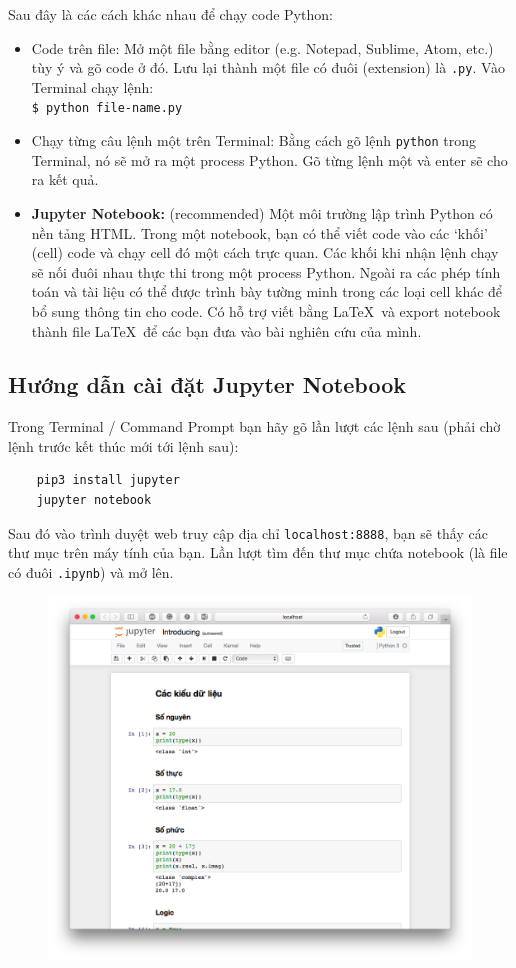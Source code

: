 \documentclass[12pt, a4paper, twoside]{article}
\begin{document}
Sau đây là các cách khác nhau để chạy code Python:
\begin{itemize}
    \item Code trên file: Mở một file bằng editor (e.g. Notepad, Sublime, Atom, etc.) tùy ý và gõ code ở đó. Lưu lại thành một file có đuôi (extension) là \texttt{.py}. Vào Terminal chạy lệnh:\\
    \texttt{\$ python file-name.py}
    \item Chạy từng câu lệnh một trên Terminal: Bằng cách gõ lệnh \texttt{python} trong Terminal, nó sẽ mở ra một process Python. Gõ từng lệnh một và enter sẽ cho ra kết quả.
    \item \textbf{Jupyter Notebook:} (recommended) Một môi trường lập trình Python có nền tảng HTML. Trong một notebook, bạn có thể viết code vào các `khối' (cell) code và chạy cell đó một cách trực quan. Các khối khi nhận lệnh chạy sẽ nối đuôi nhau thực thi trong một process Python. Ngoài ra các phép tính toán và tài liệu có thể được trình bày tường minh trong các loại cell khác để bổ sung thông tin cho code. Có hỗ trợ viết bằng \LaTeX\ và export notebook thành file \LaTeX\ để các bạn đưa vào bài nghiên cứu của mình.
\end{itemize}
\subsection*{Hướng dẫn cài đặt Jupyter Notebook}
Trong Terminal / Command Prompt bạn hãy gõ lần lượt các lệnh sau (phải chờ lệnh trước kết thúc mới tới lệnh sau):
\begin{verbatim}
    pip3 install jupyter
    jupyter notebook
\end{verbatim}
Sau đó vào trình duyệt web truy cập địa chỉ \texttt{localhost:8888}, bạn sẽ thấy các thư mục trên máy tính của bạn. Lần lượt tìm đến thư mục chứa notebook (là file có đuôi \texttt{.ipynb}) và mở lên.
\begin{figure}[htb]
    \centering
    \includegraphics{jupyter_nb.png}

\end{figure}
\end{document}
